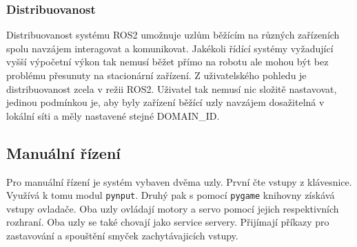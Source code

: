 \subsubsection{Distribuovanost}
Distribuovanost systému ROS2 umožnuje uzlům běžícím na různých zařízeních spolu navzájem interagovat a komunikovat. Jakékoli řídící systémy vyžadující vyšší výpočetní výkon tak nemusí běžet přímo na robotu ale mohou být bez problému přesunuty na stacionární zařízení. Z uživatelského pohledu je distribuovanost zcela v režii ROS2. Uživatel tak nemusí nic složitě nastavovat, jedinou podmínkou je, aby byly zařízení běžící uzly navzájem dosažitelná v lokální síti a měly nastavené stejné DOMAIN\_ID.

\subsection{Manuální řízení}
Pro manuální řízení je systém vybaven dvěma uzly. První čte vstupy z klávesnice. Využívá k tomu modul \verb|pynput|. Druhý pak s pomocí \verb|pygame| knihovny získává vstupy ovladače. Oba uzly ovládají motory a servo pomocí jejich respektivních rozhraní. Oba uzly se také chovají jako service servery. Přijímají příkazy pro zastavování a spouštění smyček zachytávajicích vstupy.

